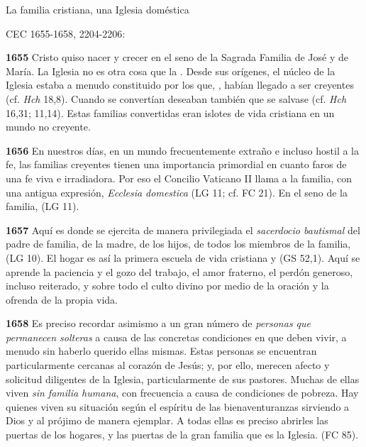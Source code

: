 La familia cristiana, una Iglesia doméstica

CEC 1655-1658, 2204-2206:

\textbf{1655} Cristo quiso nacer y crecer en el seno de la Sagrada Familia de José y de María. La Iglesia no es otra cosa que la . Desde sus orígenes, el núcleo de la Iglesia estaba a menudo constituido por los que, , habían llegado a ser creyentes (cf. \emph{Hch} 18,8). Cuando se convertían deseaban también que se salvase  (cf. \emph{Hch} 16,31; 11,14). Estas familias convertidas eran islotes de vida cristiana en un mundo no creyente.

\textbf{1656} En nuestros días, en un mundo frecuentemente extraño e incluso hostil a la fe, las familias creyentes tienen una importancia primordial en cuanto faros de una fe viva e irradiadora. Por eso el Concilio Vaticano II llama a la familia, con una antigua expresión, \emph{Ecclesia domestica} (LG 11; cf. FC 21). En el seno de la familia,  (LG 11).

\textbf{1657} Aquí es donde se ejercita de manera privilegiada el \emph{sacerdocio bautismal} del padre de familia, de la madre, de los hijos, de todos los miembros de la familia,  (LG 10). El hogar es así la primera escuela de vida cristiana y  (GS 52,1). Aquí se aprende la paciencia y el gozo del trabajo, el amor fraterno, el perdón generoso, incluso reiterado, y sobre todo el culto divino por medio de la oración y la ofrenda de la propia vida.

\textbf{1658} Es preciso recordar asimismo a un gran número de \emph{personas que permanecen solteras} a causa de las concretas condiciones en que deben vivir, a menudo sin haberlo querido ellas mismas. Estas personas se encuentran particularmente cercanas al corazón de Jesús; y, por ello, merecen afecto y solicitud diligentes de la Iglesia, particularmente de sus pastores. Muchas de ellas viven \emph{sin familia humana}, con frecuencia a causa de condiciones de pobreza. Hay quienes viven su situación según el espíritu de las bienaventuranzas sirviendo a Dios y al prójimo de manera ejemplar. A todas ellas es preciso abrirles las puertas de los hogares,  y las puertas de la gran familia que es la Iglesia.  (FC 85).

